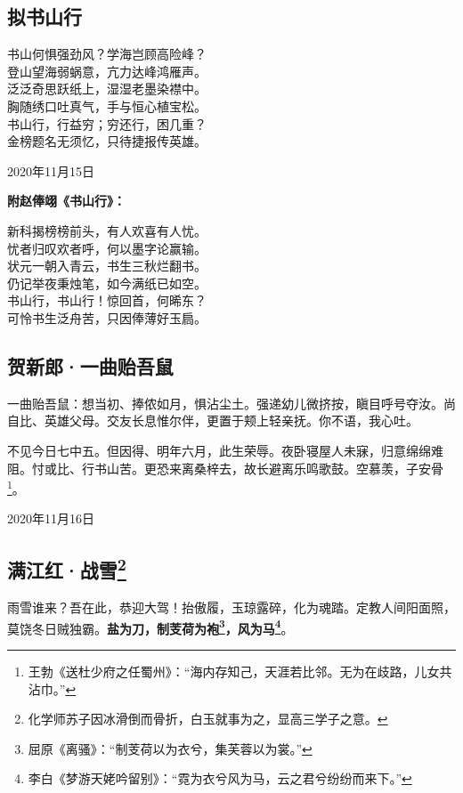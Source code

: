 \documentclass[a5paper]{ctexart}
\begin{document}
	\subsection{拟书山行}
	\begin{center}
		书山何惧强劲风？学海岂顾高险峰？\\
		登山望海弱蜗意，亢力达峰鸿雁声。\\
		泛泛奇思跃纸上，湿湿老墨染襟中。\\
		胸随绣口吐真气，手与恒心植宝松。\\
		书山行，行益穷；穷还行，困几重？\\
		金榜题名无须忆，只待捷报传英雄。
	\end{center}
	\hfill 2020年11月15日
	\begin{flushleft}
		\textbf{附赵俸翊《书山行》：}
	\end{flushleft}
	\begin{center}
		新科揭榜榜前头，有人欢喜有人忧。\\
		忧者归叹欢者呼，何以墨字论赢输。\\
		状元一朝入青云，书生三秋烂翻书。\\
		仍记举夜秉烛笔，如今满纸已如空。\\
		书山行，书山行！惊回首，何晞东？\\
		可怜书生泛舟苦，只因俸薄好玉扃。
	\end{center}
	
	\subsection{贺新郎·一曲贻吾鼠}
	一曲贻吾鼠：想当初、捧侬如月，惧沾尘土。强递幼儿微挤按，瞋目呼号夺汝。尚自比、英雄父母。交友长息惟尔伴，更置于颊上轻亲抚。你不语，我心吐。
	
	不见今日七中五。但因得、明年六月，此生荣辱。夜卧寝屋人未寐，归意绵绵难阻。忖或比、行书山苦。更恐来离桑梓去，故长避离乐鸣歌鼓。空慕羡，子安骨\footnote{王勃《送杜少府之任蜀州》：“海内存知己，天涯若比邻。无为在歧路，儿女共沾巾。”}。
	\begin{flushright}
		2020年11月16日
	\end{flushright}
	
	\subsection[满江红·战雪]{满江红·战雪\footnote{化学师苏子因冰滑倒而骨折，白玉就事为之，显高三学子之意。}}
	雨雪谁来？吾在此，恭迎大驾！抬傲履，玉琼露碎，化为魂踏。定教人间阳面照，莫饶冬日贼独霸。\textbf{盐为刀，制芰荷为袍\footnote{屈原《离骚》：“制芰荷以为衣兮，集芙蓉以为裳。”}，风为马\footnote{李白《梦游天姥吟留别》：“霓为衣兮风为马，云之君兮纷纷而来下。”}}。
	
\end{document}
